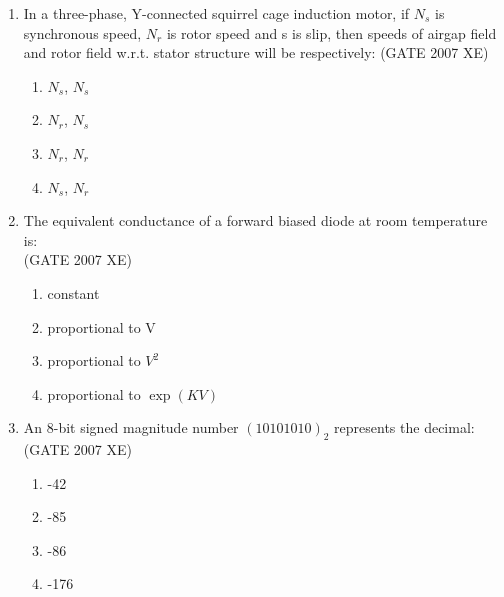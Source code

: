 \documentclass[journal,cmex10]{IEEEtran}
\theoremstyle{remark}
\numberwithin{equation}{enumi}
\numberwithin{figure}{enumi}
\begin{document}
\begin{enumerate}
    \hfill{(GATE 2007 XE)}
    \begin{multicols}{4}
    \begin{enumerate}
        \item $0.67\angle 0^\circ$
        \item $2.0\angle 0^\circ$
        \item $2.67\angle 0^\circ$
        \item $10.67\angle 0^\circ$
    \end{enumerate}
    \end{multicols}

    \item In a three-phase, Y-connected squirrel cage induction motor, if $N_s$ is synchronous speed, $N_r$ is rotor speed and s is slip, then speeds of airgap field and rotor field w.r.t. stator structure will be respectively:
    \hfill{(GATE 2007 XE)}
    \begin{multicols}{4}
    \begin{enumerate}
        \item $N_s$, $N_s$
        \item $N_r$, $N_s$
        \item $N_r$, $N_r$
        \item $N_s$, $N_r$
    \end{enumerate}
    \end{multicols}

    \item The equivalent conductance of a forward biased diode at room temperature is:\\
    \hfill{(GATE 2007 XE)}
    \begin{multicols}{2}
    \begin{enumerate}
        \item constant
        \item proportional to V
        \item proportional to $V^2$
        \item proportional to $\exp(KV)$
    \end{enumerate}
\end{multicols}

    \item An 8-bit signed magnitude number $(10101010)_2$ represents the decimal:\\
    \hfill{(GATE 2007 XE)}
    \begin{multicols}{4}
    \begin{enumerate}
        \item -42
        \item -85
        \item -86
        \item -176
    \end{enumerate}
\end{multicols}


\end{enumerate}
\end{document}
